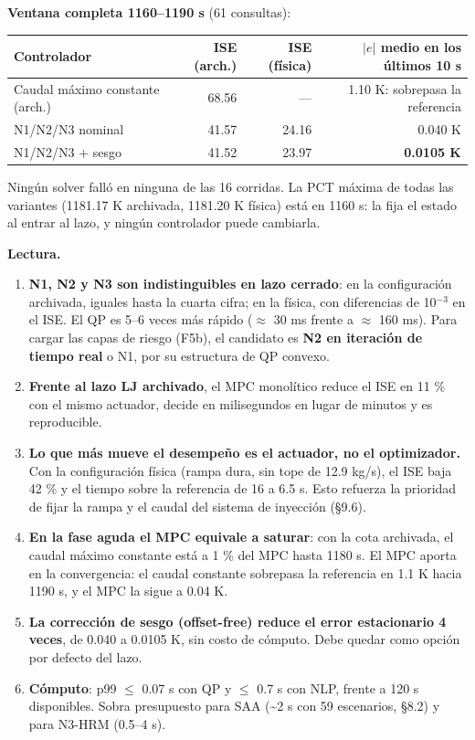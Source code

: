 \documentclass[11pt,a4paper]{article}
\begin{document}
\textbf{Ventana completa 1160–1190 s} (61 consultas):

{\footnotesize
\begin{xltabular}{\linewidth}{@{}YRRR@{}}
\toprule
\textbf{Controlador} & \textbf{ISE (arch.)} & \textbf{ISE (física)} & \textbf{$\lvert e\rvert$ medio en los últimos 10 s} \\
\midrule
\endhead
Caudal máximo constante (arch.) & 68.56 & — & 1.10 K: sobrepasa la referencia \\
N1/N2/N3 nominal & 41.57 & 24.16 & 0.040 K \\
N1/N2/N3 + sesgo & 41.52 & 23.97 & \textbf{0.0105 K} \\
\bottomrule
\end{xltabular}}

Ningún solver falló en ninguna de las 16 corridas. La PCT máxima de todas las variantes (1181.17 K archivada, 1181.20 K física) está en 1160 s: la fija el estado al entrar al lazo, y ningún controlador puede cambiarla.

\textbf{Lectura.}

\begin{enumerate}
\item \textbf{N1, N2 y N3 son indistinguibles en lazo cerrado}: en la configuración archivada, iguales hasta la cuarta cifra; en la física, con diferencias de 10$^{-3}$ en el ISE. El QP es 5–6 veces más rápido ($\approx$ 30 ms frente a $\approx$ 160 ms). Para cargar las capas de riesgo (F5b), el candidato es \textbf{N2 en iteración de tiempo real} o N1, por su estructura de QP convexo.
\item \textbf{Frente al lazo LJ archivado}, el MPC monolítico reduce el ISE en 11 \% con el mismo actuador, decide en milisegundos en lugar de minutos y es reproducible.
\item \textbf{Lo que más mueve el desempeño es el actuador, no el optimizador.} Con la configuración física (rampa dura, sin tope de 12.9 kg/s), el ISE baja 42 \% y el tiempo sobre la referencia de 16 a 6.5 s. Esto refuerza la prioridad de fijar la rampa y el caudal del sistema de inyección (\S{}9.6).
\item \textbf{En la fase aguda el MPC equivale a saturar}: con la cota archivada, el caudal máximo constante está a 1 \% del MPC hasta 1180 s. El MPC aporta en la convergencia: el caudal constante sobrepasa la referencia en 1.1 K hacia 1190 s, y el MPC la sigue a 0.04 K.
\item \textbf{La corrección de sesgo (offset-free) reduce el error estacionario 4 veces}, de 0.040 a 0.0105 K, sin costo de cómputo. Debe quedar como opción por defecto del lazo.
\item \textbf{Cómputo}: p99 $\le$ 0.07 s con QP y $\le$ 0.7 s con NLP, frente a 120 s disponibles. Sobra presupuesto para SAA (\textasciitilde{}2 s con 59 escenarios, \S{}8.2) y para N3-HRM (0.5–4 s).
\end{enumerate}
\end{document}
